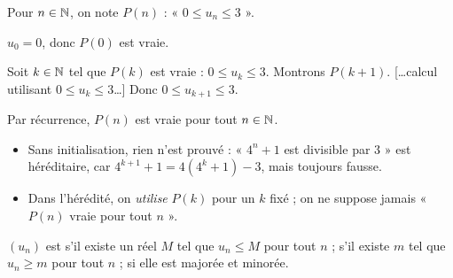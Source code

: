 \begin{paire}
\begin{redaction}
\fontsize{9.6}{12}\selectfont
Pour $n\in\mathbb{N}$, on note $P(n)$ : « $0\leq u_n\leq3$ ».\par
{} $u_0=0$, donc $P(0)$ est vraie.\par
{} Soit $k\in\mathbb{N}$ tel que $P(k)$ est vraie : $0\leq u_k\leq3$. Montrons $P(k+1)$.
[…calcul utilisant $0\leq u_k\leq3$…] Donc $0\leq u_{k+1}\leq3$.\par
{} Par récurrence, $P(n)$ est vraie pour tout $n\in\mathbb{N}$.
\end{redaction}
\begin{attention}
\begin{itemize}
  \item Sans initialisation, rien n'est prouvé : « $4^{n}+1$ est divisible par $3$ » est héréditaire,
    car \mbox{$4^{k+1}+1=4(4^{k}+1)-3$}, mais toujours fausse.
  \item Dans l'hérédité, on \emph{utilise} $P(k)$ pour un $k$ fixé ; on ne suppose jamais
    « $P(n)$ vraie pour tout $n$ ».
\end{itemize}
\end{attention}
\end{paire}


\begin{definition}
$(u_n)$ est  s'il existe un réel $M$ tel que $u_n\leq M$ pour tout $n$ ;
 s'il existe $m$ tel que $u_n\geq m$ pour tout $n$ ;  si elle est
majorée et minorée.
\end{definition}

